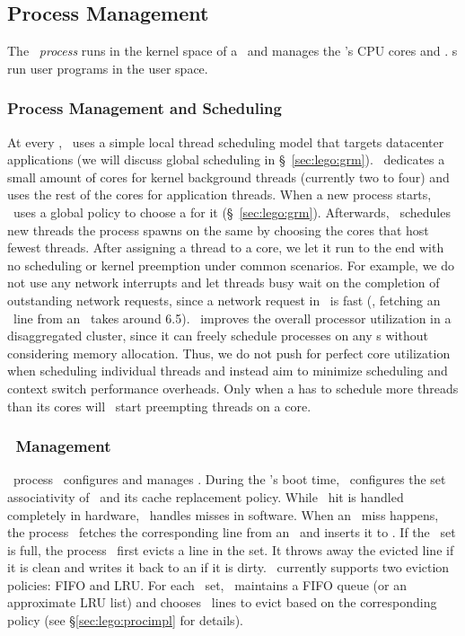 \subsection{Process Management}
The \lego\ {\em process \microos{}} runs in the kernel space of a \pcomponent\
and manages the \pcomponent's CPU cores and \excache. 
\pcomponent{}s run user programs in the user space.

\subsubsection{Process Management and Scheduling}
\label{sec:lego:proc-scheduling}
At every \pcomponent, \lego\ uses a simple local thread scheduling model 
that targets datacenter applications 
(we will discuss global scheduling in \S~\ref{sec:lego:grm}).
\lego\ dedicates a small amount of cores for kernel background threads 
(currently two to four)
and uses the rest of the cores for application threads.
When a new process starts, \lego\ uses a global policy to choose a \pcomponent{} for it (\S~\ref{sec:lego:grm}).
Afterwards, \lego\ schedules new threads the process spawns on the same \pcomponent{} 
by choosing the cores that host fewest threads.
After assigning a thread to a core, 
we let it run to the end with no scheduling or kernel preemption under common scenarios.
For example, we do not use any network interrupts 
and let threads busy wait on the completion of outstanding network requests, 
since a network request in \lego\ is fast 
(\eg, fetching an \excache\ line from an \mcomponent\ takes around 6.5\mus).
\lego\ improves the overall processor utilization in a disaggregated cluster,
since it can freely schedule processes on any \pcomponent{}s without considering memory allocation.
Thus, we do not push for perfect core utilization when scheduling individual threads
and instead aim to minimize scheduling and context switch performance overheads.
Only when a \pcomponent{} has to schedule 
more threads than its cores will
\lego\ start preempting threads on a core.

\subsubsection{\excache\ Management}
\label{sec:lego:excachemgmt}
\lego\ process \microos\ configures and manages \excache.
During the \pcomponent{}'s boot time, \lego\ configures the set associativity of \excache\
and its cache replacement policy.
While \excache\ hit is handled completely in hardware, 
\lego\ handles misses in software.
When an \excache\ miss happens, 
the process \microos\ fetches the corresponding line from an \mcomponent\ and inserts it to \excache.
If the \excache\ set is full, the process \microos\ first evicts a line in the set.
It throws away the evicted line if it is clean
and writes it back to an \mcomponent{} if it is dirty.
\lego\ currently supports two eviction policies: FIFO and LRU.
For each \excache\ set, \lego\ maintains a FIFO queue (or an approximate LRU list)
and chooses \excache\ lines to evict based on the corresponding policy (see \S\ref{sec:lego:procimpl} for details).

